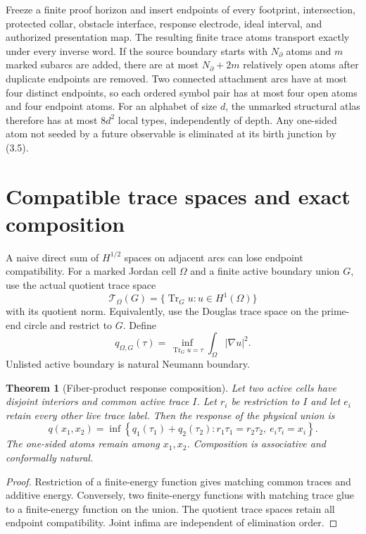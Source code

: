 \documentclass[11pt]{article}
\newtheorem{theorem}{Theorem}[section]
\theoremstyle{definition}
\theoremstyle{remark}
\newcommand{\Tr}{\operatorname{Tr}}
\begin{document}
Freeze a finite proof horizon and insert endpoints of every footprint,
intersection, protected collar, obstacle interface, response electrode, ideal
interval, and authorized presentation map.  The resulting finite trace atoms
transport exactly under every inverse word.  If the source boundary starts with
$N_\partial$ atoms and $m$ marked subarcs are added, there are at most
$N_\partial+2m$ relatively open atoms after duplicate endpoints are removed.
Two connected attachment arcs have at most four distinct endpoints, so each
ordered symbol pair has at most four open atoms and four endpoint atoms.  For an
alphabet of size $d$, the unmarked structural atlas therefore has at most
$8d^2$ local types, independently of depth.  Any one-sided atom not seeded by a
future observable is eliminated at its birth junction by (3.5).

\section{Compatible trace spaces and exact composition}

A naive direct sum of $H^{1/2}$ spaces on adjacent arcs can lose endpoint
compatibility.  For a marked Jordan cell $\Omega$ and a finite active boundary
union $G$, use the actual quotient trace space
\[
 \mathcal T_\Omega(G)=\{\Tr_Gu:u\in H^1(\Omega)\}
 \tag{3.1}
\]
with its quotient norm.  Equivalently, use the Douglas trace space on the
prime-end circle and restrict to $G$.  Define
\[
 q_{\Omega,G}(\tau)=
 \inf_{\Tr_Gu=\tau}\int_\Omega|\nabla u|^2.
 \tag{3.2}
\]
Unlisted active boundary is natural Neumann boundary.

\begin{theorem}[Fiber-product response composition]
Let two active cells have disjoint interiors and common active trace $I$.  Let
$r_i$ be restriction to $I$ and let $e_i$ retain every other live trace label.
Then the response of the physical union is
\[
 \boxed{
 q(x_1,x_2)=\inf
 \left\{q_1(\tau_1)+q_2(\tau_2):
 r_1\tau_1=r_2\tau_2,\ e_i\tau_i=x_i\right\}.}
 \tag{3.3}
\]
The one-sided atoms remain among $x_1,x_2$.  Composition is associative and
conformally natural.
\end{theorem}

\begin{proof}
Restriction of a finite-energy function gives matching common traces and
additive energy.  Conversely, two finite-energy functions with matching trace
glue to a finite-energy function on the union.  The quotient trace spaces retain
all endpoint compatibility.  Joint infima are independent of elimination order.
\end{proof}
\end{document}
